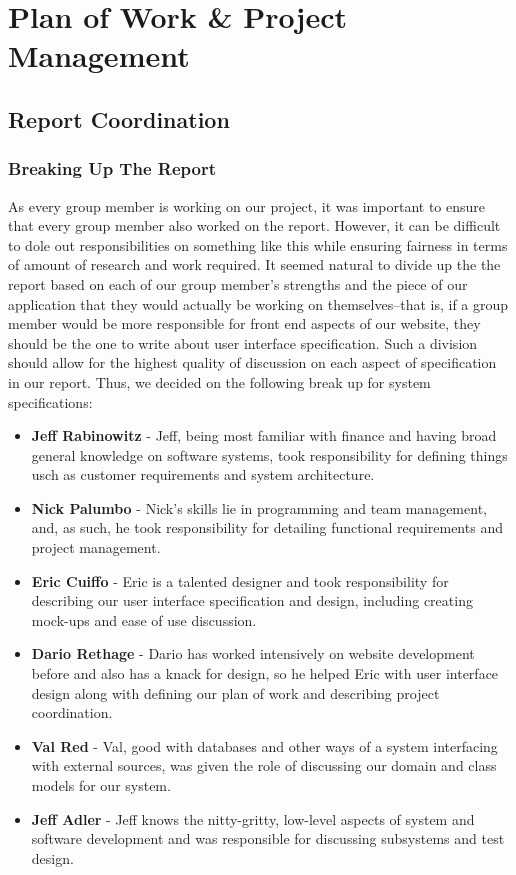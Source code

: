 \chapter{Plan of Work \& Project Management}

\section{Report Coordination}
\subsection{Breaking Up The Report}
As every group member is working on our project, it was important to ensure that every group member also worked on the report. However, it can be difficult to dole out responsibilities on something like this while ensuring fairness in terms of amount of research and work required. It seemed natural to divide up the the report based on each of our group member's strengths and the piece of our application that they would actually be working on themselves--that is, if a group member would be more responsible for front end aspects of our website, they should be the one to write about user interface specification. Such a division should allow for the highest quality of discussion on each aspect of specification in our report. Thus, we decided on the following break up for system specifications: \\
\begin{itemize}
\item{\textbf{Jeff Rabinowitz} - Jeff, being most familiar with finance and having broad general knowledge on software systems, took responsibility for defining things usch as customer requirements and system architecture.}
\item{\textbf{Nick Palumbo} - Nick's skills lie in programming and team management, and, as such, he took responsibility for detailing functional requirements and project management.}
\item{\textbf{Eric Cuiffo} - Eric is a talented designer and took responsibility for describing our user interface specification and design, including creating mock-ups and ease of use discussion.}
\item{\textbf{Dario Rethage} - Dario has worked intensively on website development before and also has a knack for design, so he helped Eric with user interface design along with defining our plan of work and describing project coordination.}
\item{\textbf{Val Red} - Val, good with databases and other ways of a system interfacing with external sources, was given the role of discussing our domain and class models for our system.}
\item{\textbf{Jeff Adler} - Jeff knows the nitty-gritty, low-level aspects of system and software development and was responsible for discussing subsystems and test design.}
\end{itemize}
